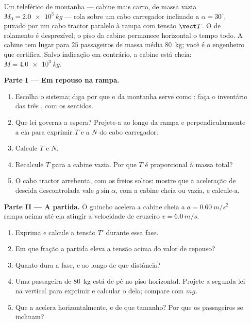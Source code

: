 \begin{problem}
\label{pb:g12:newtons-laws:1}
Um teleférico de montanha --- cabine mais carro, de massa vazia
$M_0 = \qty{2.0e3}{kg}$ --- rola sobre um cabo carregador inclinado a
$\alpha = 30^\circ$, puxado por um cabo tractor paralelo à rampa com tensão $\vect T$.
O  de rolamento é desprezível; o piso da cabine permanece horizontal o tempo
todo. A cabine tem lugar para $25$ passageiros de massa média \qty{80}{kg}; você é o
engenheiro que certifica. Salvo indicação em contrário, a cabine está cheia:
$M = \qty{4.0e3}{kg}$.

\medskip
\noindent\textbf{Parte I --- Em repouso na rampa.}
\begin{enumerate}
  \item Escolha o sistema; diga por que o  da montanha serve como
        ; faça o inventário das três , com os sentidos.
  \item Que lei governa a espera? Projete-a ao longo da rampa e perpendicularmente a
        ela para exprimir $T$ e a  $N$ do cabo carregador.
  \item Calcule $T$ e $N$.
  \item Recalcule $T$ para a cabine vazia. Por que $T$ é proporcional à massa total?
  \item O cabo tractor arrebenta, com os freios soltos: mostre que a aceleração de
        descida descontrolada vale $g \sin\alpha$, com a cabine cheia ou vazia, e
        calcule-a.
\end{enumerate}

\medskip
\noindent\textbf{Parte II --- A partida.} O guincho acelera a cabine cheia a
$a = \qty{0.60}{m/s^2}$ rampa acima até ela atingir a velocidade de cruzeiro
$v = \qty{6.0}{m/s}$.
\begin{enumerate}[resume]
  \item Exprima e calcule a tensão $T'$ durante essa fase.
  \item Em que fração a partida eleva a tensão acima do valor de repouso?
  \item Quanto dura a fase, e ao longo de que distância?
  \item Uma passageira de \qty{80}{kg} está de pé no piso horizontal. Projete a
        segunda lei na vertical para exprimir e calcular o  dela; compare
        com $mg$.
  \item Que  a acelera horizontalmente, e de que tamanho? Por que os passageiros
        se inclinam?
\end{enumerate}


\end{problem}
